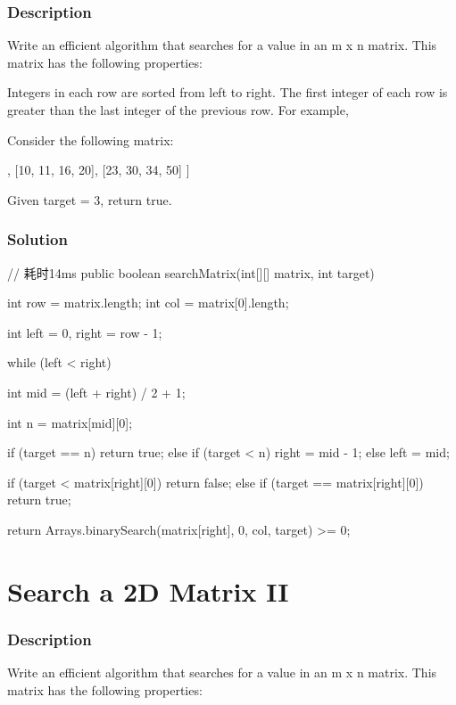 \subsubsection{Description}
Write an efficient algorithm that searches for a value in an m x n matrix. This matrix has the following properties:

Integers in each row are sorted from left to right.
The first integer of each row is greater than the last integer of the previous row.
For example,

Consider the following matrix:
\begin{Code}
[
  [1,   3,  5,  7],
  [10, 11, 16, 20],
  [23, 30, 34, 50]
]
\end{Code}

Given target = 3, return true.
\subsubsection{Solution}

\begin{Code}
// 耗时14ms
public boolean searchMatrix(int[][] matrix, int target) {
    int row = matrix.length;
    int col = matrix[0].length;

    int left = 0, right = row - 1;

    while (left < right) {
        int mid = (left + right) / 2 + 1;

        int n = matrix[mid][0];

        if (target == n) {
            return true;
        } else if (target < n) {
            right = mid - 1;
        } else {
            left = mid;
        }
    }

    if (target < matrix[right][0]) {
        return false;
    } else if (target == matrix[right][0]) {
        return true;
    }

    return Arrays.binarySearch(matrix[right], 0, col, target) >= 0;
}
\end{Code}

\newpage

\section{Search a 2D Matrix II} %

\subsubsection{Description}
Write an efficient algorithm that searches for a value in an m x n matrix. This matrix has the following properties:

